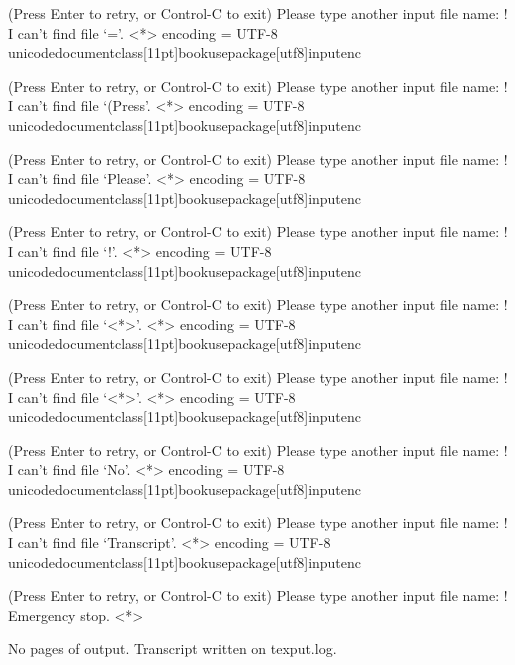 (Press Enter to retry, or Control-C to exit)
Please type another input file name: ! I can't find file `='.
<*> encoding 
             = UTF-8 unicodedocumentclass[11pt]{book}usepackage[utf8]{inputenc}

(Press Enter to retry, or Control-C to exit)
Please type another input file name: ! I can't find file `(Press'.
<*> encoding 
             = UTF-8 unicodedocumentclass[11pt]{book}usepackage[utf8]{inputenc}

(Press Enter to retry, or Control-C to exit)
Please type another input file name: ! I can't find file `Please'.
<*> encoding 
             = UTF-8 unicodedocumentclass[11pt]{book}usepackage[utf8]{inputenc}

(Press Enter to retry, or Control-C to exit)
Please type another input file name: ! I can't find file `!'.
<*> encoding 
             = UTF-8 unicodedocumentclass[11pt]{book}usepackage[utf8]{inputenc}

(Press Enter to retry, or Control-C to exit)
Please type another input file name: ! I can't find file `<*>'.
<*> encoding 
             = UTF-8 unicodedocumentclass[11pt]{book}usepackage[utf8]{inputenc}

(Press Enter to retry, or Control-C to exit)
Please type another input file name: ! I can't find file `<*>'.
<*> encoding 
             = UTF-8 unicodedocumentclass[11pt]{book}usepackage[utf8]{inputenc}

(Press Enter to retry, or Control-C to exit)
Please type another input file name: ! I can't find file `No'.
<*> encoding 
             = UTF-8 unicodedocumentclass[11pt]{book}usepackage[utf8]{inputenc}

(Press Enter to retry, or Control-C to exit)
Please type another input file name: ! I can't find file `Transcript'.
<*> encoding 
             = UTF-8 unicodedocumentclass[11pt]{book}usepackage[utf8]{inputenc}

(Press Enter to retry, or Control-C to exit)
Please type another input file name: 
! Emergency stop.
<*> 
    
No pages of output.
Transcript written on texput.log.
